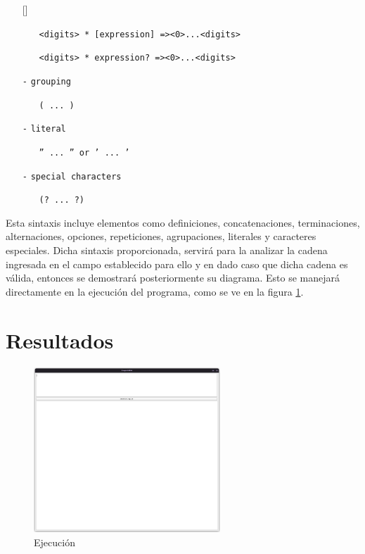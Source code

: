 \documentclass[conference]{IEEEtran}
\begin{document}
\begin{itemize} [\footnotesize]
\begin{itemize}
        \item [ ] \texttt{<digits> * [expression] =>\hspace{0.2cm}<0>...<digits>}
        \item [ ] \texttt{<digits> * expression? =>\hspace{0.2cm}<0>...<digits>}
    \end{itemize}
    \item [\texttt{-}] \texttt{grouping}
    \begin{itemize}
        \item [ ] \texttt{( ... )}
    \end{itemize}
    \item [\texttt{-}] \texttt{literal}
    \begin{itemize}
        \item [ ] \texttt{'' ... '' or ' ... '}
    \end{itemize}
    \item [\texttt{-}] \texttt{special characters}
    \begin{itemize}
        \item [ ] \texttt{(? ... ?)}
    \end{itemize}
\end{itemize}

Esta sintaxis incluye elementos como definiciones, concatenaciones, terminaciones, alternaciones, opciones, repeticiones, agrupaciones, literales y caracteres especiales. Dicha sintaxis proporcionada, servirá para la analizar la cadena ingresada en el campo establecido para ello y en dado caso que dicha cadena es válida, entonces se demostrará posteriormente su diagrama. Esto se manejará directamente en la ejecución del programa, como se ve en la figura \ref{fig:ejecucion}.

\section{Resultados}


\begin{figure} [H]
    \centering
    \includegraphics[width= 7cm]{imagen 1.png}
    \caption{Ejecución}
    \label{fig:ejecucion}
\end{figure}
\end{document}
